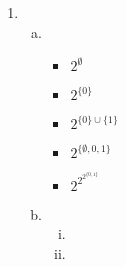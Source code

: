 \documentclass{article}
\begin{document}
\begin{enumerate}
\begin{enumerate}[(a)]
    \item %

  \end{enumerate}

  \item
  \begin{enumerate}[(a)]
    \item %
    \begin{itemize}
      \item $2^{\emptyset}$

      \item $2^{\{0\}}$

      \item $2^{\{0\} \cup \{1\}}$

      \item $2^{\{\emptyset, 0, 1\}}$

      \item $2^{2^{2^{\{0,1\}}}}$

    \end{itemize}

    \item %
    \begin{enumerate}[(i)]
      \item %

      \item %

    \end{enumerate}

  \end{enumerate}
\end{enumerate}
\end{document}
